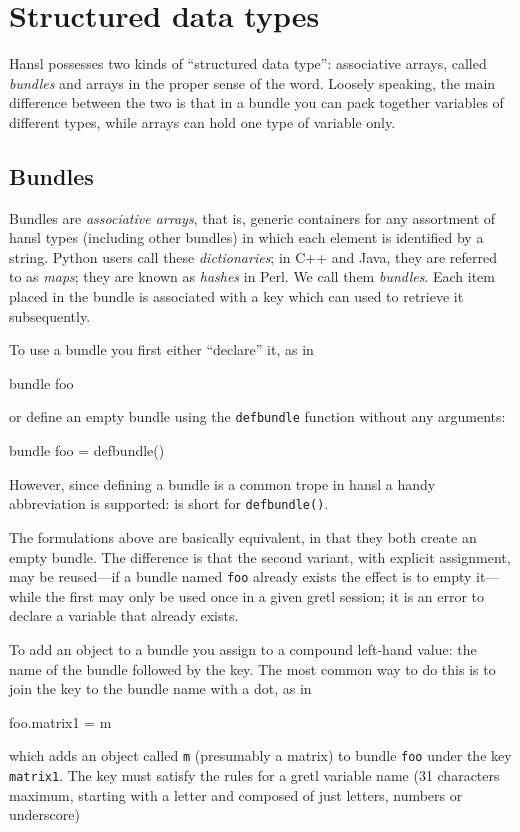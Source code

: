 \chapter{Structured data types}
\label{chap:structypes}

Hansl possesses two kinds of ``structured data type'': associative
arrays, called \emph{bundles} and arrays in the proper sense of the
word. Loosely speaking, the main difference between the two is that in
a bundle you can pack together variables of different types, while
arrays can hold one type of variable only.

\section{Bundles}
\label{sec:bundles}

Bundles are \emph{associative arrays}, that is, generic containers for
any assortment of hansl types (including other bundles) in which each
element is identified by a string. Python users call these
\emph{dictionaries}; in C++ and Java, they are referred to as
\emph{maps}; they are known as \emph{hashes} in Perl. We call them
\emph{bundles}. Each item placed in the bundle is associated with a
key which can used to retrieve it subsequently.

To use a bundle you first either ``declare'' it, as in
%
\begin{code}
bundle foo
\end{code}
%
or define an empty bundle using the \texttt{defbundle} function
without any arguments:
%
\begin{code}
bundle foo = defbundle()
\end{code}
%
However, since defining a bundle is a common trope in hansl a handy
abbreviation is supported: \cmd{\_()} is short for
\texttt{defbundle()}.

The formulations above are basically equivalent, in that they both
create an empty bundle. The difference is that the second variant,
with explicit assignment, may be reused---if a bundle named
\texttt{foo} already exists the effect is to empty it---while the
first may only be used once in a given gretl session; it is an error
to declare a variable that already exists.

To add an object to a bundle you assign to a compound left-hand value:
the name of the bundle followed by the key. The most common way to do
this is to join the key to the bundle name with a dot, as in
\begin{code}
  foo.matrix1 = m
\end{code}
which adds an object called \texttt{m} (presumably a matrix) to bundle
\texttt{foo} under the key \texttt{matrix1}. The key must satisfy the
rules for a gretl variable name (31 characters maximum, starting
with a letter and composed of just letters, numbers or underscore)

